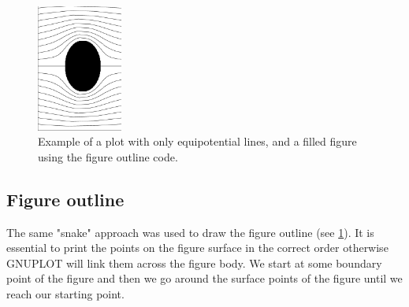 \documentclass[aps,twocolumn,pre,nofootinbib,10pt]{revtex4-1}
\begin{document}
\begin{figure}[h]
\begin{center}
\includegraphics[width=0.25\textwidth,angle=-90]{pure_eqlines.eps}
\caption{Example of a plot with only equipotential lines, and a filled figure using the figure outline code.}
\label{pureeq}
\end{center}
\end{figure}

\subsection{Figure outline}
The same "snake" approach was used to draw the figure outline (see \ref{pureeq}). It is essential to print the points on the figure surface in the correct order otherwise GNUPLOT will link them across the figure body. We start at some boundary point of the figure and then we go around the surface points of the figure until we reach our starting point. 

\end{document}
